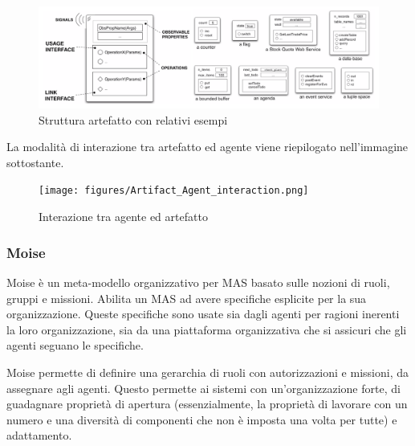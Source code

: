 \begin{figure}[H]
\centering
\includegraphics[width=\linewidth]{figures/Artifact_structure_example.png}
\caption{Struttura artefatto con relativi esempi}
\end{figure}

La modalità di interazione tra artefatto ed agente viene riepilogato nell'immagine sottostante.

\begin{figure}[H]
\centering
\texttt{[image: figures/Artifact\_Agent\_interaction.png]}
\caption{Interazione tra agente ed artefatto}
\end{figure}

\subsubsection{Moise}
Moise è un meta-modello organizzativo per MAS basato sulle nozioni di ruoli, gruppi e missioni. Abilita un MAS ad avere specifiche esplicite per la sua organizzazione. Queste specifiche sono usate sia dagli agenti per ragioni inerenti la loro organizzazione, sia da una piattaforma organizzativa che si assicuri che gli agenti seguano le specifiche.

Moise permette di definire una gerarchia di ruoli con autorizzazioni e missioni, da assegnare agli agenti. Questo permette ai sistemi con un'organizzazione forte, di guadagnare proprietà di apertura (essenzialmente, la proprietà di lavorare con un numero e una diversità di componenti che non è imposta una volta per tutte) e adattamento.
